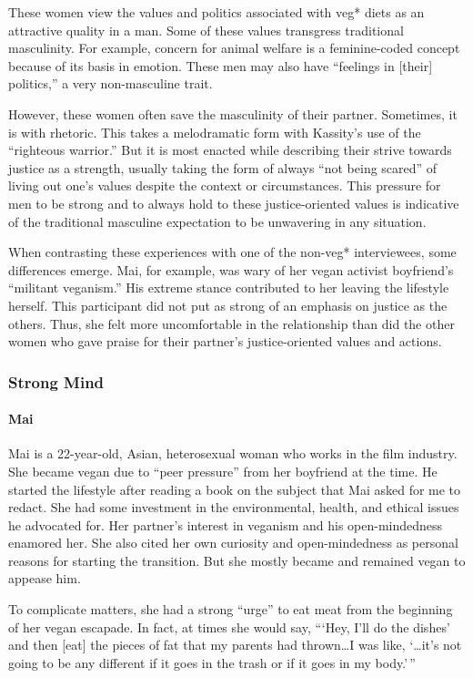 \documentclass[twoside]{report}
\begin{document}
\begin{multicols}{2}
These women view the values and politics associated with veg* diets as
an attractive quality in a man. Some of these values transgress
traditional masculinity. For example, concern for animal welfare is a
feminine-coded concept because of its basis in emotion. These men may
also have ``feelings in {[}their{]} politics,'' a very non-masculine
trait.

However, these women often save the masculinity of their partner.
Sometimes, it is with rhetoric. This takes a melodramatic form with
Kassity's use of the ``righteous warrior.'' But it is most enacted while
describing their strive towards justice as a strength, usually taking
the form of always ``not being scared'' of living out one's values
despite the context or circumstances. This pressure for men to be strong
and to always hold to these justice-oriented values is indicative of the
traditional masculine expectation to be unwavering in any situation.

When contrasting these experiences with one of the non-veg*
interviewees, some differences emerge. Mai, for example, was wary of her
vegan activist boyfriend's ``militant veganism.'' His extreme stance
contributed to her leaving the lifestyle herself. This participant did not put
as strong of an emphasis on justice as the others. Thus, she
felt more uncomfortable in the relationship than did the other women who
gave praise for their partner's justice-oriented values and actions.

\subsubsection{Strong Mind}

\paragraph{Mai}

Mai is a 22-year-old, Asian, heterosexual woman who works in the film
industry. She became vegan due to ``peer pressure'' from her boyfriend
at the time. He started the lifestyle after reading a book on the subject that Mai asked for me to redact. She had some investment in the environmental, health, and ethical issues he advocated for. Her partner's interest in veganism and his open-mindedness enamored her. She also cited her own curiosity and open-mindedness as personal reasons
for starting the transition. But she mostly became and remained vegan to appease him. 

To complicate matters, she had a strong ``urge'' to eat meat from the beginning of her vegan escapade. In fact, at times she would say, ```Hey, I'll do the dishes' and then {[}eat{]} the pieces of fat that my parents had thrown\ldots{}I was like, `\ldots it's not going to be any different if
it goes in the trash or if it goes in my body.'\,''


\end{multicols}
\end{document}
